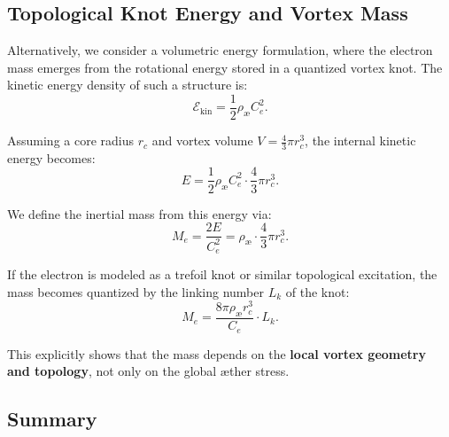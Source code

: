 \subsection*{Topological Knot Energy and Vortex Mass}
\label{sec:mass-knot}

Alternatively, we consider a volumetric energy formulation, where the electron mass emerges from the rotational energy stored in a quantized vortex knot. The kinetic energy density of such a structure is:
\begin{equation*}
    \mathcal{E}_{\text{kin}} = \frac{1}{2} \rho_\text{\ae} C_e^2.
\end{equation*}

Assuming a core radius \( r_c \) and vortex volume \( V = \frac{4}{3} \pi r_c^3 \), the internal kinetic energy becomes:
\begin{equation*}
    E = \frac{1}{2} \rho_\text{\ae} C_e^2 \cdot \frac{4}{3} \pi r_c^3.
\end{equation*}

We define the inertial mass from this energy via:
\begin{equation*}
    M_e = \frac{2E}{C_e^2} = \rho_\text{\ae} \cdot \frac{4}{3} \pi r_c^3.
\end{equation*}

If the electron is modeled as a trefoil knot or similar topological excitation, the mass becomes quantized by the linking number \( L_k \) of the knot:
\begin{equation}
    M_e = \frac{8\pi \rho_\text{\ae} r_c^3}{C_e} \cdot L_k.
\end{equation}

This explicitly shows that the mass depends on the \textbf{local vortex geometry and topology}, not only on the global æther stress.

\subsection*{Summary}

